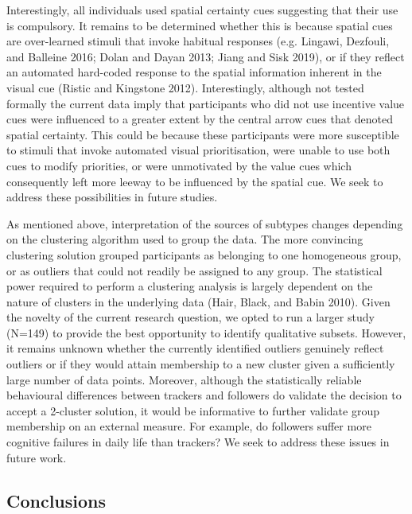 \documentclass[11pt,halfline,a4paper,]{ouparticle}
\begin{document}
Interestingly, all individuals used spatial certainty cues suggesting that their use is compulsory. It remains to be determined whether this is because spatial cues are over-learned stimuli that invoke habitual responses (e.g. Lingawi, Dezfouli, and Balleine 2016; Dolan and Dayan 2013; Jiang and Sisk 2019), or if they reflect an automated hard-coded response to the spatial information inherent in the visual cue (Ristic and Kingstone 2012). Interestingly, although not tested formally the current data imply that participants who did not use incentive value cues were influenced to a greater extent by the central arrow cues that denoted spatial certainty. This could be because these participants were more susceptible to stimuli that invoke automated visual prioritisation, were unable to use both cues to modify priorities, or were unmotivated by the value cues which consequently left more leeway to be influenced by the spatial cue. We seek to address these possibilities in future studies.

As mentioned above, interpretation of the sources of subtypes changes depending on the clustering algorithm used to group the data. The more convincing clustering solution grouped participants as belonging to one homogeneous group, or as outliers that could not readily be assigned to any group. The statistical power required to perform a clustering analysis is largely dependent on the nature of clusters in the underlying data (Hair, Black, and Babin 2010). Given the novelty of the current research question, we opted to run a larger study (N=149) to provide the best opportunity to identify qualitative subsets. However, it remains unknown whether the currently identified outliers genuinely reflect outliers or if they would attain membership to a new cluster given a sufficiently large number of data points. Moreover, although the statistically reliable behavioural differences between trackers and followers do validate the decision to accept a 2-cluster solution, it would be informative to further validate group membership on an external measure. For example, do followers suffer more cognitive failures in daily life than trackers? We seek to address these issues in future work.

\hypertarget{conclusions}{%
\subsection{Conclusions}\label{conclusions}}

\label{sec:conclusions}
\end{document}
